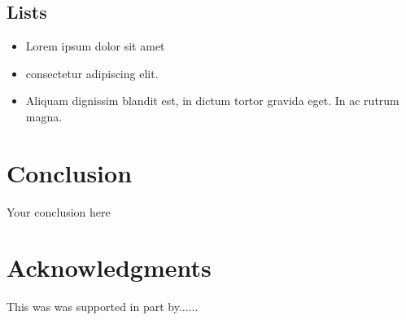 \documentclass{article}
\begin{document}
\subsection{Lists}
\begin{itemize}
\item Lorem ipsum dolor sit amet
\item consectetur adipiscing elit. 
\item Aliquam dignissim blandit est, in dictum tortor gravida eget. In ac rutrum magna.
\end{itemize}


\section{Conclusion}
Your conclusion here

\section*{Acknowledgments}
This was was supported in part by......

  
  
\end{document}
